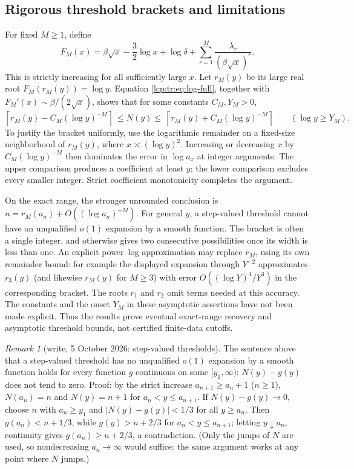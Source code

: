 \documentclass[11pt]{article}
\numberwithin{equation}{section}
\theoremstyle{definition}\newtheorem{definition}[theorem]{Definition}
\theoremstyle{remark}\newtheorem{remark}[theorem]{Remark}
\begin{document}
\subsection{Rigorous threshold brackets and limitations}
For fixed $M\ge1$, define
\[
 F_M(x)=\beta\sqrt x-\frac32\log x+\log\delta
         +\sum_{r=1}^{M}\frac{\lambda_r}{(\beta\sqrt x)^r}.
\]
This is strictly increasing for all sufficiently large $x$. Let $r_M(y)$ be its
large real root $F_M(r_M(y))=\log y$. Equation \eqref{lcp:tr:eq:log-full}, together with
$F_M'(x)\sim\beta/(2\sqrt x)$, shows that for some constants $C_M,Y_M>0$,
\begin{equation}\label{lcp:tr:eq:threshold-bracket}
 \left\lceil r_M(y)-C_M(\log y)^{-M}\right\rceil
 \ \le N(y)\le\ 
 \left\lceil r_M(y)+C_M(\log y)^{-M}\right\rceil
 \qquad(\log y\ge Y_M).
\end{equation}
To justify the bracket uniformly, use the logarithmic remainder on a fixed-size
neighborhood of $r_M(y)$, where $x\asymp(\log y)^2$. Increasing or decreasing $x$
by $C_M(\log y)^{-M}$ then dominates the error in $\log a_x$ at integer arguments.
The upper comparison produces a coefficient at least $y$; the lower comparison
excludes every smaller integer. Strict coefficient monotonicity completes the
argument.

On the exact range, the stronger unrounded conclusion is
$n=r_M(a_n)+O((\log a_n)^{-M})$. For general $y$, a step-valued threshold cannot
have an unqualified $o(1)$ expansion by a smooth function. The bracket is often
a single integer, and otherwise gives two consecutive possibilities once its
width is less than one. An explicit power--log approximation may replace
$r_M$, using its own remainder bound: for example the displayed expansion
through $Y^{-2}$ approximates $r_3(y)$ (and likewise $r_M(y)$ for $M\ge3$) with error $O((\log Y)^4/Y^3)$ in the corresponding bracket. The roots $r_1$ and $r_2$ omit terms needed at this accuracy.
The constants and the onset $Y_M$ in these asymptotic assertions have not been
made explicit. Thus the results prove eventual exact-range recovery and
asymptotic threshold bounds, not certified finite-data cutoffs.

\begin{remark}[write, 5 October 2026: step-valued thresholds]\label{lcp:tr:rem:step}
The sentence above that a step-valued threshold has no unqualified $o(1)$
expansion by a smooth function holds for every function $g$ continuous on
some $[y_1,\infty)$: $N(y)-g(y)$ does not tend to zero. Proof: by the strict
increase $a_{n+1}\ge a_n+1$ ($n\ge1$), $N(a_n)=n$ and $N(y)=n+1$ for
$a_n<y\le a_{n+1}$. If $N(y)-g(y)\to0$, choose $n$ with $a_n\ge y_1$ and
$|N(y)-g(y)|<1/3$ for all $y\ge a_n$. Then $g(a_n)<n+1/3$, while
$g(y)>n+2/3$ for $a_n<y\le a_{n+1}$; letting $y\downarrow a_n$, continuity
gives $g(a_n)\ge n+2/3$, a contradiction. (Only the jumps of $N$ are used,
so nondecreasing $a_n\to\infty$ would suffice: the same argument works at
any point where $N$ jumps.)
\end{remark}
\end{document}
